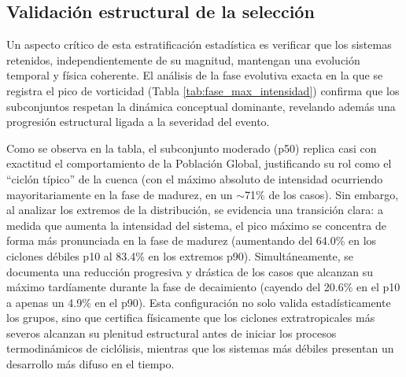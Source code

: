 % 
\subsection{Validación estructural de la selección}\label{subsec:validacao_selecao}

Un aspecto crítico de esta estratificación estadística es verificar que los sistemas retenidos, independientemente de su magnitud, mantengan una evolución temporal y física coherente. El análisis de la fase evolutiva exacta en la que se registra el pico de vorticidad (Tabla \ref{tab:fase_max_intensidad}) confirma que los subconjuntos respetan la dinámica conceptual dominante, revelando además una progresión estructural ligada a la severidad del evento. 

Como se observa en la tabla, el subconjunto moderado (p50) replica casi con exactitud el comportamiento de la Población Global, justificando su rol como el ``ciclón típico'' de la cuenca (con el máximo absoluto de intensidad ocurriendo mayoritariamente en la fase de madurez, en un $\sim$71\% de los casos). Sin embargo, al analizar los extremos de la distribución, se evidencia una transición clara: a medida que aumenta la intensidad del sistema, el pico máximo se concentra de forma más pronunciada en la fase de madurez (aumentando del 64.0\% en los ciclones débiles p10 al 83.4\% en los extremos p90). Simultáneamente, se documenta una reducción progresiva y drástica de los casos que alcanzan su máximo tardíamente durante la fase de decaimiento (cayendo del 20.6\% en el p10 a apenas un 4.9\% en el p90). Esta configuración no solo valida estadísticamente los grupos, sino que certifica físicamente que los ciclones extratropicales más severos alcanzan su plenitud estructural antes de iniciar los procesos termodinámicos de ciclólisis, mientras que los sistemas más débiles presentan un desarrollo más difuso en el tiempo.


